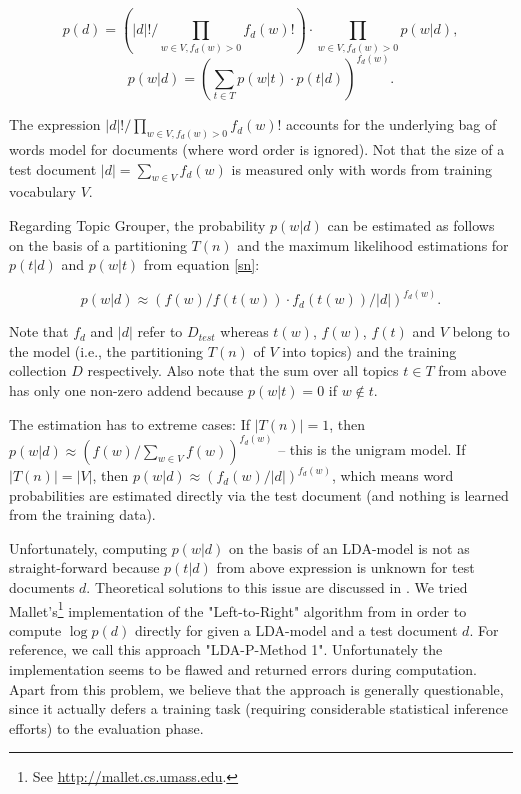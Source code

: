 \documentclass[10pt, a4paper, oneside]{article}
\begin{document}
\[p(d) = (|d|! / \prod_{w \in V, f_d(w) > 0} f_d(w)!) \cdot \prod_{w \in V, f_d(w) > 0} p(w|d),\] 
\[p(w|d) = (\sum_{t \in T} p(w|t) \cdot p(t|d))^{f_d(w)}.\]

The expression $|d|! / \prod_{w \in V, f_d(w) > 0} f_d(w)!$ accounts for the underlying bag of words model for documents (where word order is ignored).
Not that the size of a test document $|d| = \sum_{w \in V} f_d(w)$ is measured only with words from training vocabulary $V$.

Regarding Topic Grouper, the probability $p(w|d)$ can be estimated as follows on the basis of a partitioning $T(n)$ and the maximum likelihood estimations for $p(t|d)$ and $p(w|t)$ from equation \ref{sn}:

\[ p(w|d) \approx (f(w) / f(t(w)) \cdot f_d(t(w)) / |d|)^{f_d(w)}.\]

Note that $f_d$ and $|d|$ refer to $D_{test}$ whereas $t(w)$, $f(w)$, $f(t)$ and $V$ belong to the model (i.e., the partitioning $T(n)$ of $V$ into topics) and the training collection $D$ respectively.  Also note that the sum over all topics ${t \in T}$ from above has only one non-zero addend because $p(w|t) = 0$ if $w \notin t$.

The estimation has to extreme cases: If $|T(n)| = 1$, then $p(w|d) \approx (f(w) / \sum_{w \in V} f(w))^{f_d(w)}$ -- this is the unigram model. If $|T(n)| = |V|$, then  $p(w|d) \approx (f_d(w) / |d|)^{f_d(w)}$, which means word probabilities are estimated directly via the test document (and nothing is learned from the training data).

Unfortunately, computing $p(w|d)$ on the basis of an LDA-model is not as straight-forward because $p(t|d)$ from above expression is unknown for test documents $d$.
Theoretical solutions to this issue are discussed in \cite{Wallach:2009:EMT:1553374.1553515}.
We tried Mallet's\footnote{See \href{http://mallet.cs.umass.edu}{http://mallet.cs.umass.edu}.} implementation of the "Left-to-Right" algorithm from \cite{wallach08} in order to compute $\log p(d)$ directly for given a LDA-model and a test document $d$. For reference, we call this approach "LDA-P-Method 1". Unfortunately the implementation seems to be flawed and returned errors during computation.
Apart from this problem, we believe that the approach is generally questionable, since it actually defers a training task (requiring considerable statistical inference efforts) to the evaluation phase.
\end{document}
